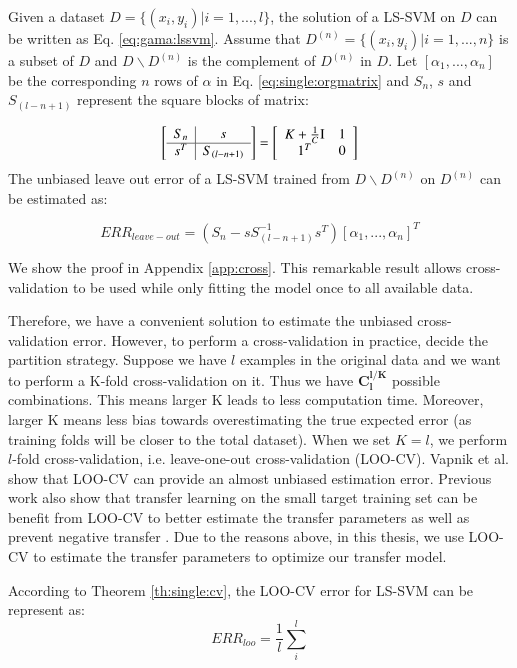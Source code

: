 \begin{theorem}\label{th:single:cv}
	Given a dataset $D=\{(x_i,y_i)|i=1,...,l\}$, the solution of a LS-SVM on $D$ can be written as Eq. \eqref{eq:gama:lssvm}.
	Assume that $D^{(n)} = \{(x_i,y_i)|i=1,...,n\}$ is a subset of $D$ and $D\backslash D^{(n)}$ is the complement of $D^{(n)}$ in $D$. 
	Let $\left[\alpha_1,...,\alpha_n\right]$ be the corresponding $n$ rows of $\alpha$ in Eq. \eqref{eq:single:orgmatrix} and $S_n$, $s$ and $S_{(l - n + 1)}$ represent the square blocks of matrix:
	
	\begin{equation*}
	\left[ {\begin{array}{c|c}
		{{S_{n }}} &s\\ \hline
		{{s^T}}&{{S_{(l - n + 1)}}}
		\end{array}} \right] =\left[ {\begin{array}{*{20}{c}}
		{K  + \frac{1}{C}{\rm I}}\\
		1^T
		\end{array}\begin{array}{*{20}{c}}
		1\\
		0
		\end{array}} \right]
	\end{equation*}
	The unbiased leave out error of a LS-SVM trained from $D\backslash D^{(n)}$ on $D^{(n)}$ can be estimated as:
	
	\begin{equation*}\label{eq:single:nout}
	ERR_{leave-out} = \left( {{S_n} - sS_{(l - n + 1)}^{ - 1}{s^T}} \right){\left[ {{\alpha _1},...,{\alpha _n}} \right]^T}
	\end{equation*}
\end{theorem}
We show the proof in Appendix \ref{app:cross}. This remarkable result allows cross-validation to be used while only fitting the model once to all available data.

Therefore, we have a convenient solution to estimate the unbiased cross-validation error. However, to perform a cross-validation in practice, decide the partition strategy. Suppose we have $l$ examples in the original data and we want to perform a K-fold cross-validation on it. Thus we have $\mathbf{C^{l/K}_l}$ possible combinations. This means larger K leads to less computation time. Moreover, larger K means less bias towards overestimating the true expected error (as training folds will be closer to the total dataset). When we set $K=l$, we perform $l$-fold cross-validation, i.e. leave-one-out cross-validation (LOO-CV). Vapnik et al. \cite{vapnik2000bounds} show that LOO-CV can provide an almost unbiased estimation error. Previous work also show that transfer learning on the small target training set can be benefit from LOO-CV to better estimate the transfer parameters as well as prevent negative transfer \cite{kuzborskij2013stability}. Due to the reasons above, in this thesis, we use LOO-CV to estimate the transfer parameters to optimize our transfer model.

According to Theorem \ref{th:single:cv}, the LOO-CV error for LS-SVM can be represent as:
\begin{equation}
	ERR_{loo}=\frac{1}{l}\sum_{i}^{l}
\end{equation}